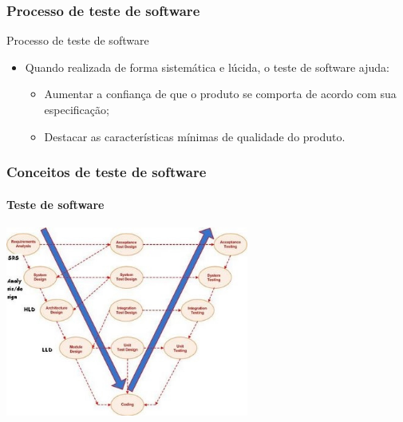 \begin{frame}[parent={cmap:software-testing-foundations}, hasprev=false, hasnext=true]
\frametitle{Processo de teste de software}
\label{concept:software-testing-process}
\label{concept:test-process}

\begin{block:fact}{Processo de teste de software}
\begin{itemize}
	\item Quando realizada de forma sistemática e lúcida, o teste de software ajuda:
	\begin{itemize}
		\item Aumentar a confiança de que o produto se comporta de acordo com sua especificação;

		\item Destacar as características mínimas de qualidade do produto.
	\end{itemize}
\end{itemize}
\end{block:fact}
\end{frame}


\begin{frame}[hasprev=true, hasnext=false]
\frametitle{Conceitos de teste de software}
\framesubtitle{Teste de software}

\begin{block:fact}{}
	\centering
	\includegraphics[width=8cm]{teste-de-software/conceitos-basicos/Imagens/v-model}
\end{block:fact}
\end{frame}